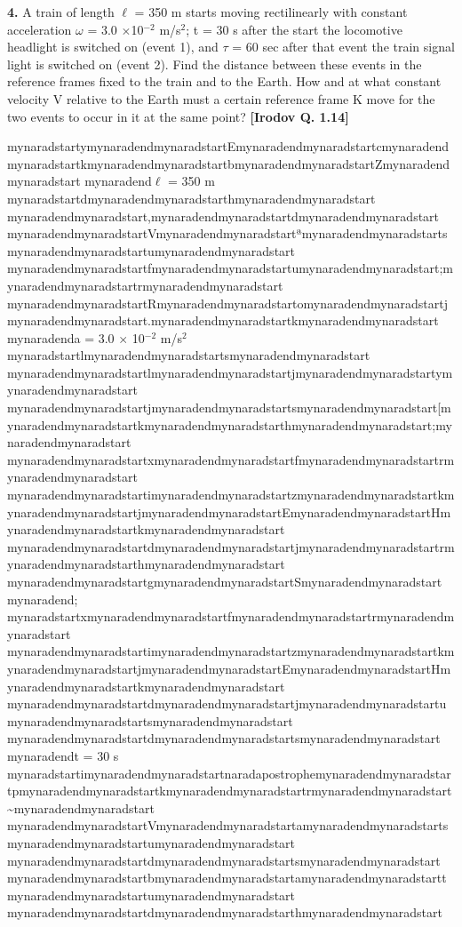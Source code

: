 \documentclass{scrbook}
\begin{document}
\textbf{4.} A train of length ${\ell}$ = 350 m starts moving rectilinearly with constant acceleration ${\omega}$ = 3.0 ${\times}$10$^{\mathrm{-2}}$ m/s$^{2}$; t = 30 s after the start the locomotive headlight is switched on (event 1), and ${\tau}$ = 60 sec after that event the train signal light is switched on (event 2). Find the distance between these events in the reference frames fixed to the train and to the Earth. How and at what constant velocity V relative to the Earth must a certain reference frame K move for the two events to occur in it at the same point?  \textbf{[Irodov Q. 1.14]}

mynaradstartymynaradendmynaradstartEmynaradendmynaradstartcmynaradendmynaradstartkmynaradendmynaradstartbmynaradendmynaradstartZmynaradendmynaradstart mynaradend${\ell}$ = 350 m mynaradstartdmynaradendmynaradstarthmynaradendmynaradstart mynaradendmynaradstart,mynaradendmynaradstartdmynaradendmynaradstart mynaradendmynaradstartVmynaradendmynaradstartªmynaradendmynaradstartsmynaradendmynaradstartumynaradendmynaradstart mynaradendmynaradstartfmynaradendmynaradstartumynaradendmynaradstart;mynaradendmynaradstartrmynaradendmynaradstart mynaradendmynaradstartRmynaradendmynaradstartomynaradendmynaradstartjmynaradendmynaradstart.mynaradendmynaradstartkmynaradendmynaradstart mynaradenda = 3.0 ${\times}$ 10$^{\mathrm{-2}}$  m/s$^{2}$  mynaradstartlmynaradendmynaradstartsmynaradendmynaradstart mynaradendmynaradstartlmynaradendmynaradstartjmynaradendmynaradstartymynaradendmynaradstart mynaradendmynaradstartjmynaradendmynaradstartsmynaradendmynaradstart[mynaradendmynaradstartkmynaradendmynaradstarthmynaradendmynaradstart;mynaradendmynaradstart mynaradendmynaradstartxmynaradendmynaradstartfmynaradendmynaradstartrmynaradendmynaradstart mynaradendmynaradstartimynaradendmynaradstartzmynaradendmynaradstartkmynaradendmynaradstartjmynaradendmynaradstartEmynaradendmynaradstartHmynaradendmynaradstartkmynaradendmynaradstart mynaradendmynaradstartdmynaradendmynaradstartjmynaradendmynaradstartrmynaradendmynaradstarthmynaradendmynaradstart mynaradendmynaradstartgmynaradendmynaradstartSmynaradendmynaradstart mynaradend; mynaradstartxmynaradendmynaradstartfmynaradendmynaradstartrmynaradendmynaradstart mynaradendmynaradstartimynaradendmynaradstartzmynaradendmynaradstartkmynaradendmynaradstartjmynaradendmynaradstartEmynaradendmynaradstartHmynaradendmynaradstartkmynaradendmynaradstart mynaradendmynaradstartdmynaradendmynaradstartjmynaradendmynaradstartumynaradendmynaradstartsmynaradendmynaradstart mynaradendmynaradstartdmynaradendmynaradstartsmynaradendmynaradstart mynaradendt = 30 s mynaradstartimynaradendmynaradstartnaradapostrophemynaradendmynaradstartpmynaradendmynaradstartkmynaradendmynaradstartrmynaradendmynaradstart\textasciitilde{}mynaradendmynaradstart mynaradendmynaradstartVmynaradendmynaradstartamynaradendmynaradstartsmynaradendmynaradstartumynaradendmynaradstart mynaradendmynaradstartdmynaradendmynaradstartsmynaradendmynaradstart mynaradendmynaradstartbmynaradendmynaradstartamynaradendmynaradstarttmynaradendmynaradstartumynaradendmynaradstart mynaradendmynaradstartdmynaradendmynaradstarthmynaradendmynaradstart 
\end{document}
